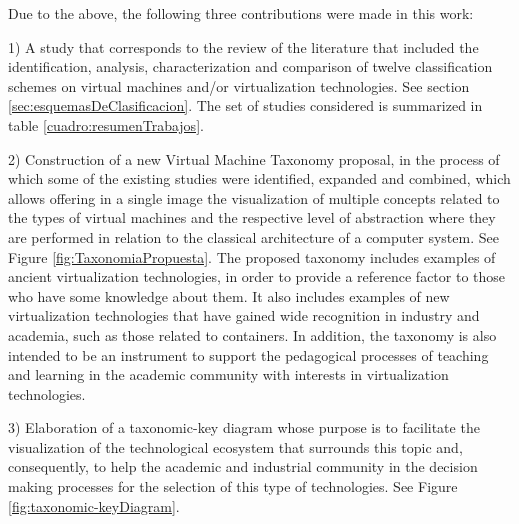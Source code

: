 	
	
	
	

    
    Due to the above, the following three contributions were made in this work:

    1) A study that corresponds to the review of the literature that included the identification, analysis, characterization and comparison of twelve classification schemes on virtual machines and/or virtualization technologies. See section \ref{sec:esquemasDeClasificacion}. The set of studies considered is summarized in table \ref{cuadro:resumenTrabajos}. 

    2) Construction of a new Virtual Machine Taxonomy proposal, in the process of which some of the existing studies were identified, expanded and combined, which allows offering in a single image the visualization of multiple concepts related to the types of virtual machines and the respective level of abstraction where they are performed in relation to the classical architecture of a computer system. See Figure \ref{fig:TaxonomiaPropuesta}.  The proposed taxonomy includes examples of ancient virtualization technologies, in order to provide a reference factor to those who have some knowledge about them. It also includes examples of new virtualization technologies that have gained wide recognition in industry and academia, such as those related to containers. In addition, the taxonomy is also intended to be an instrument to support the pedagogical processes of teaching and learning in the academic community with interests in virtualization technologies. 

    3) Elaboration of a taxonomic-key diagram whose purpose is to facilitate the visualization of the technological ecosystem that surrounds this topic and, consequently, to help the academic and industrial community in the decision making processes for the selection of this type of technologies. See Figure \ref{fig:taxonomic-keyDiagram}.